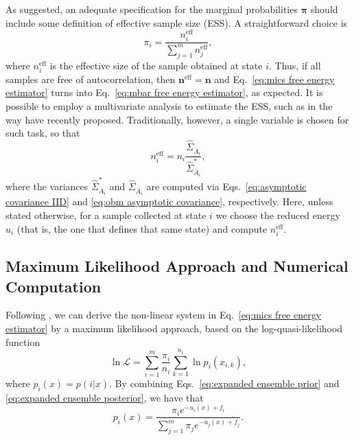 \documentclass[
    journal=jctcce,
    layout=twocolumn
]{achemso}
\newcommand{\vt}[1]{\boldsymbol{\mathbf{#1}}}   %
\newcommand{\avg}[1]{\overline{#1}}             %
\begin{document}
As \citeauthor{Roy_2018} \cite{Roy_2018} suggested, an adequate specification for the marginal probabilities $\vt \pi$ should include some definition of effective sample size (ESS). A straightforward choice is
\begin{equation}
\label{eq:mics prior}
\pi_i = \frac{n^\text{eff}_i}{\sum_{j=1}^m n^\text{eff}_j},
\end{equation}
where $n^\text{eff}_i$ is the effective size of the sample obtained at state $i$. Thus, if all samples are free of autocorrelation, then ${\vt n}^\text{eff} = \vt n$ and Eq.~\eqref{eq:mics free energy estimator} turns into Eq.~\eqref{eq:mbar free energy estimator}, as expected. It is possible to employ a multivariate analysis to estimate the ESS, such as in the way \citeauthor{Vats_2015} \cite{Vats_2015, *Vats_2018} have recently proposed. Traditionally, however, a single variable is chosen for such task, so that
\begin{equation*}
n^\text{eff}_i = n_i \frac{ \hat{\Sigma}_{\avg{A}_i} }{ \hat{\Sigma}^\ast_{\avg{A}_i} },
\end{equation*}
where the variances $\hat{\Sigma}_{\avg{A}_i}^\ast$ and $\hat{\Sigma}_{\avg{A}_i}$ are computed via Eqs.~\eqref{eq:asymptotic covariance IID} and \eqref{eq:obm asymptotic covariance}, respectively. Here, unless stated otherwise, for a sample collected at state $i$ we choose the reduced energy $u_i$ (that is, the one that defines that same state) and compute $n^\text{eff}_i$.

\subsection{Maximum Likelihood Approach and Numerical Computation}
\label{sec:maximum likelihood}

Following \citeauthor{Doss_2014} \cite{Doss_2014}, we can derive the non-linear system in Eq.~\eqref{eq:mics free energy estimator} by a maximum likelihood approach, based on the log-quasi-likelihood function \cite{Doss_2014, Tan_2015, Roy_2018}
\begin{equation}
\label{eq:mics log-quasi-likelihood}
\ln \mathcal L = \sum_{i=1}^m \frac{\pi_i}{n_i} \sum_{k=1}^{n_i} \ln p_i(x_{i,k}),
\end{equation}
where $p_i(x) = p(i|x)$. By combining Eqs.~\eqref{eq:expanded ensemble prior} and \eqref{eq:expanded ensemble posterior}, we have that
\begin{equation}
\label{eq:mixture posterior probability}
p_i(x) = \frac{\pi_i e^{-u_i(x) + f_i}}{\sum_{j=1}^m \pi_j e^{-u_j(x) + f_j}}.
\end{equation}
\end{document}
